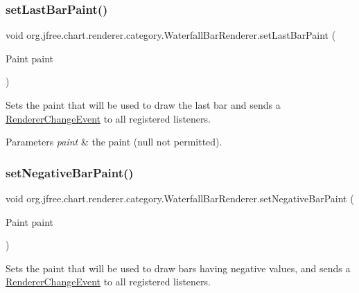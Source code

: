 \subsubsection{\texorpdfstring{set\+Last\+Bar\+Paint()}{setLastBarPaint()}}
{\footnotesize\ttfamily void org.\+jfree.\+chart.\+renderer.\+category.\+Waterfall\+Bar\+Renderer.\+set\+Last\+Bar\+Paint (\begin{DoxyParamCaption}\item[{Paint}]{paint }\end{DoxyParamCaption})}

Sets the paint that will be used to draw the last bar and sends a \mbox{\hyperlink{}{Renderer\+Change\+Event}} to all registered listeners.


\begin{DoxyParams}{Parameters}
{\em paint} & the paint ({\ttfamily null} not permitted). \\
\hline
\end{DoxyParams}
\mbox{\label{classorg_1_1jfree_1_1chart_1_1renderer_1_1category_1_1_waterfall_bar_renderer_a218eb64e52ef5e218c3459724defcd7d}} 
\subsubsection{\texorpdfstring{set\+Negative\+Bar\+Paint()}{setNegativeBarPaint()}}
{\footnotesize\ttfamily void org.\+jfree.\+chart.\+renderer.\+category.\+Waterfall\+Bar\+Renderer.\+set\+Negative\+Bar\+Paint (\begin{DoxyParamCaption}\item[{Paint}]{paint }\end{DoxyParamCaption})}

Sets the paint that will be used to draw bars having negative values, and sends a \mbox{\hyperlink{}{Renderer\+Change\+Event}} to all registered listeners.



